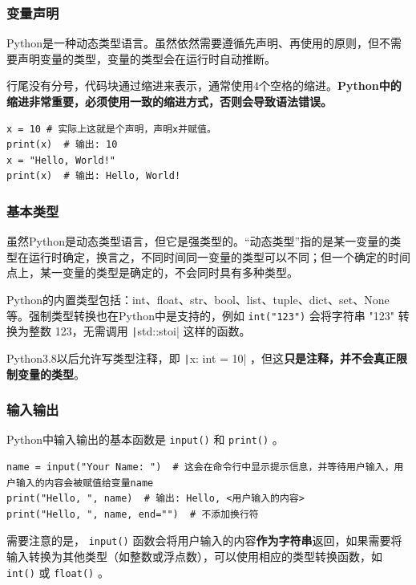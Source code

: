 \begin{frame}[fragile]
    \frametitle{变量声明}

    Python是一种动态类型语言。虽然依然需要遵循先声明、再使用的原则，但不需要声明变量的类型，变量的类型会在运行时自动推断。

    行尾没有分号，代码块通过缩进来表示，通常使用4个空格的缩进。\textbf{Python中的缩进非常重要，必须使用一致的缩进方式，否则会导致语法错误。}
    \begin{verbatim}
x = 10 # 实际上这就是个声明，声明x并赋值。
print(x)  # 输出: 10
x = "Hello, World!"
print(x)  # 输出: Hello, World!
    \end{verbatim}

\end{frame}

\begin{frame}
    \frametitle{基本类型}

    虽然Python是动态类型语言，但它是强类型的。“动态类型”指的是某一变量的类型在运行时确定，换言之，不同时间同一变量的类型可以不同；但一个确定的时间点上，某一变量的类型是确定的，不会同时具有多种类型。

    Python的内置类型包括：int、float、str、bool、list、tuple、dict、set、None等。强制类型转换也在Python中是支持的，例如 \texttt{int("123")} 会将字符串 "123" 转换为整数 123，无需调用 \texttt|std::stoi| 这样的函数。

    Python3.8以后允许写类型注释，即 \texttt|x: int = 10| ，但这\textbf{只是注释，并不会真正限制变量的类型}。

\end{frame}

\begin{frame}[fragile]
    \frametitle{输入输出}

    Python中输入输出的基本函数是 \texttt{input()} 和 \texttt{print()} 。

    \begin{verbatim}
name = input("Your Name: ")  # 这会在命令行中显示提示信息，并等待用户输入，用户输入的内容会被赋值给变量name
print("Hello, ", name)  # 输出: Hello, <用户输入的内容>
print("Hello, ", name, end="")  # 不添加换行符
    \end{verbatim}
    需要注意的是， \texttt{input()} 函数会将用户输入的内容\textbf{作为字符串}返回，如果需要将输入转换为其他类型（如整数或浮点数），可以使用相应的类型转换函数，如 \texttt{int()} 或 \texttt{float()} 。
    
\end{frame}

